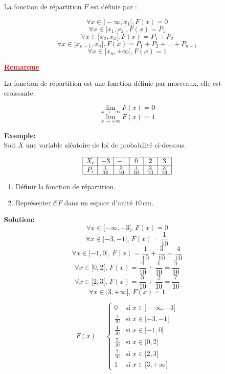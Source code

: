 \documentclass[12pt,a4paper]{article}
\begin{document}
La fonction de répartition \( F \) est définie par :

\[
\forall x \in]-\infty, x_1[, F(x) = 0
\]
\[
\forall x \in [x_1, x_2[, F(x) = P_1
\]
\[
\forall x \in [x_2, x_3[, F(x) = P_1 + P_2
\]
\[
\forall x \in [x_{n-1}, x_n[, F(x) = P_1 + P_2 + \dots + P_{n-1}
\]
\[
\forall x \in [x_n, +\infty[, F(x) = 1
\]


\underline{\textbf{\textcolor{red}{Remarque}}}

La fonction de répartition est une fonction définie par morceaux, elle est croissante.

\[
\lim_{x \to -\infty} F(x) = 0
\]
\[
\lim_{x \to +\infty} F(x) = 1
\]

\textbf{Exemple:} \\
Soit \( X \) une variable aléatoire de loi de probabilité ci-dessous.

\[
\begin{array}{|c|c|c|c|c|c|}
\hline
X_i & -3 & -1 & 0 & 2 & 3 \\
\hline
P_i & \frac{1}{10} & \frac{3}{10} & \frac{1}{10} & \frac{2}{10} & \frac{3}{10} \\
\hline
\end{array}
\]

\begin{enumerate}
    \item Définir la fonction de répartition.
    \item Représenter \( \mathcal{C}F \) dans un espace d’unité \( 10 \, \text{cm} \).
\end{enumerate}

\textbf{Solution:} \\

\[
\forall x \in  [-\infty, -3[, \, F( x ) = 0
\]
\[
\forall x \in [-3, -1[, \, F( x ) = \frac{1}{10}
\]
\[
\forall x \in [-1, 0[, \, F( x ) = \frac{1}{10} + \frac{3}{10} = \frac{4}{10}
\]
\[
\forall x \in [0, 2[, \, F( x ) = \frac{4}{10} + \frac{1}{10} = \frac{5}{10}
\]
\[
\forall x \in [2, 3[, \, F( x ) = \frac{5}{10} + \frac{2}{10} = \frac{7}{10}
\]
\[
\forall x \in [3, +\infty[, \, F( x ) = 1
\]

\[
F(x) =
\begin{cases}
0 & \text{si } x \in  ]-\infty, -3] \\
\frac{1}{10} & \text{si } x \in [-3, -1[ \\
\frac{4}{10} & \text{si } x \in [-1, 0[ \\
\frac{5}{10} & \text{si } x \in [0, 2[ \\
\frac{7}{10} & \text{si } x \in [2, 3[ \\
1 & \text{si } x \in [3, +\infty[
\end{cases}
\]
\end{document}
